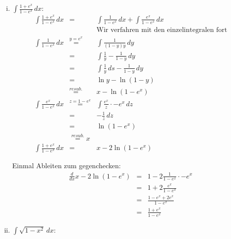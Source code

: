 \documentclass[11pt,a4paper,ngerman]{article}
\begin{document}
\begin{enumerate}[(i)]
	\item $\int \frac{1+e^x}{1-e^x} \, dx$:\\

		$$\begin{array}{rcl}
            \int \frac{1+e^x}{1-e^x} \, dx
                &=& \int \frac{1}{1-e^x} \, dx + \int \frac{e^x}{1-e^x} \, dx\\
            &&\text{Wir verfahren mit den einzelintegralen fort}\\
            \int \frac{1}{1-e^x} \, dx &\stackrel{y=e^x}{=}&
                \int \frac{1}{(1-y)y} \, dy\\
                &=& \int \frac{1}{y} - \frac{1}{1-y} \, dy\\
                &=& \int \frac{1}{y} \, ds - \frac{1}{1-y} \, dy\\
                &=& \ln y - \ln (1-y)\\
                &\stackrel{resub.}{=}& x - \ln (1-e^x)\\
           \int \frac{e^x}{1-e^x} \, dx &\stackrel{z=1-e^x}{=}&
                \int \frac{e^x}{z} \cdot -e^x \, dz\\
                &=& -\frac{1}{z} \, dz\\
                &=& \ln (1- e^x)\\
                &\stackrel{resub.}{=} x\\
            \int \frac{1+e^x}{1-e^x} \, dx &=& x - 2\ln (1-e^x)
        \end{array}$$

        Einmal Ableiten zum gegenchecken:\\
        $$\begin{array}{rcl}
            \frac{d}{dx} x-2\ln(1-e^x)
                &=& 1 - 2 \frac{1}{1-e^x} \cdot -e^x\\
                &=& 1 + 2 \frac{e^x}{1-e^x}\\
                &=& \frac{1-e^x +2e^x}{1-e^x}\\
                &=& \frac{1+e^x}{1-e^x}
        \end{array}$$


	\item $\int \sqrt{1-x^2} \, dx$:\\


\end{enumerate}
\end{document}
